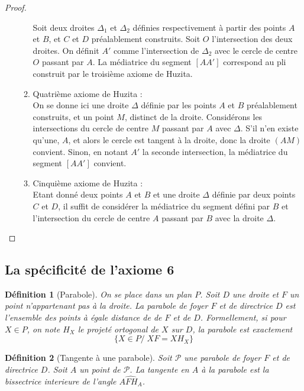 \documentclass[a4paper,12pt,french,draft]{report}
\newtheorem{definition}{Définition}[section]
\begin{document}
\begin{proof}
\begin{enumerate}
\begin{enumerate}
					Soit deux droites $\Delta_1$ et $\Delta_2$ définies respectivement à partir des points $A$ et $B$, et $C$ et $D$ préalablement construits. Soit $O$ l'intersection des deux droites. On définit $A'$ comme l'intersection de $\Delta_2$ avec le cercle de centre $O$ passant par $A$. La médiatrice du segment $[AA']$ correspond au pli construit par le troisième axiome de Huzita.
				
				\item{Quatrième axiome de Huzita :}\\
					On se donne ici une droite $\Delta$ définie par les points $A$ et $B$ préalablement construits, et un point $M$, distinct de la droite. Considérons les intersections du cercle de centre $M$ passant par $A$ avec $\Delta$. S'il n'en existe qu'une, $A$, et alors le cercle est tangent à la droite, donc la droite $(AM)$ convient. Sinon, en notant $A'$ la seconde intersection, la médiatrice du segment $[AA']$ convient.
				\item{Cinquième axiome de Huzita :}\\
					Etant donné deux points $A$ et $B$ et une droite $\Delta$ définie par deux points $C$ et $D$, il suffit de considérer la médiatrice du segment défini par $B$ et l'intersection du cercle de centre $A$ passant par $B$ avec la droite $\Delta$.
				\end{enumerate}
			\end{enumerate}
			\end{proof}

\subsection{La spécificité de l'axiome 6}
			
			\begin{definition}[Parabole]
				On se place dans un plan $P$. Soit $D$ une droite et $F$ un point n'appartenant pas à la droite. La parabole de foyer $F$ et de directrice $D$ est l'ensemble des points à égale distance de de $F$ et de $D$. Formellement, si pour $X \in P$, on note $H_{X}$ le projeté ortogonal de $X$ sur $D$, la parabole est exactement  
				\[\{X\in P /\; XF = XH_{X}\}\]
			\end{definition}
			\begin{definition}[Tangente à une parabole]
				Soit $\mathcal{P}$ une parabole de foyer $F$ et de directrice $D$. Soit $A$ un point de $\mathcal{P}$. La tangente en $A$ à la parabole est la bissectrice interieure de l'angle $\widehat{AFH_{A}}$.
			\end{definition}
			
\end{document}
